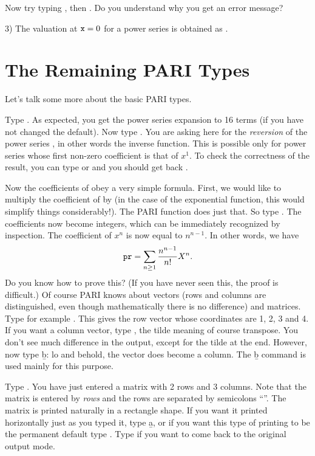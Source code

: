 Now try typing , then
. Do you understand why you get an error message?

3) The valuation at ${\tt x} = 0$ for a power series  is obtained
as .

\section{The Remaining PARI Types}
Let's talk some more about the basic PARI types.

Type . As expected, you get the power series expansion
to 16 terms (if you have not changed the default). Now type
. You are asking here for the \emph{reversion} of the
power series , in other words the inverse function. This is possible
only for power series whose first non-zero coefficient is that of $x^1$.  To
check the correctness of the result, you can type  or
 and you should get back .

Now the coefficients of  obey a very simple formula. First, we would
like to multiply the coefficient of  by  (in the case of
the exponential function, this would simplify things considerably!). The PARI
function  does just that. So type .
The coefficients now become integers, which can be immediately recognized by
inspection. The coefficient of $x^n$ is now equal to
$n^{n-1}$. In other words, we have
%
$${\tt pr} = \sum_{n\ge1}{{n^{n-1}}\over{n!}} X^{n}.$$
%
Do you know how to prove this? (If you have never seen this, the proof is
difficult.)
\smallskip
%
Of course PARI knows about vectors (rows and columns are distinguished, even
though mathematically there is no difference) and matrices. Type for example
\kbd{[1,2,3,4]}. This gives the row vector whose coordinates are 1, 2, 3 and
4.  If you want a column vector, type \kbd{[1,2,3,4]\til}, the tilde meaning
of course transpose. You don't see much difference in the output, except for
the tilde at the end. However, now type \b{b}: lo and behold, the vector does
become a column. The \b{b} command is used mainly for this purpose.

Type . You have just entered a matrix with 2 rows and
3 columns. Note that the matrix is entered by \emph{rows} and the rows are
separated by semicolons ``\kbd{;}''. The matrix is printed naturally in a
rectangle shape. If you want it printed horizontally just as you typed it,
type \b{a}, or if you want this type of printing to be the permanent default
type . Type  if you want to
come back to the original output mode.

